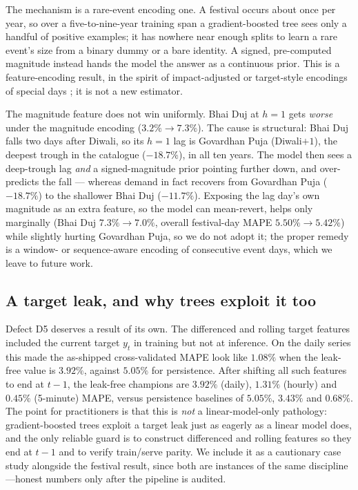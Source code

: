 \documentclass[11pt]{article}
\newcommand{\pct}{\%}
\begin{document}
The mechanism is a rare-event encoding one. A festival occurs about once per year,
so over a five-to-nine-year training span a gradient-boosted tree sees only a
handful of positive examples; it has nowhere near enough splits to learn a
rare event's size from a binary dummy or a bare identity. A signed, pre-computed
magnitude instead hands the model the answer as a continuous prior. This is a
feature-encoding result, in the spirit of impact-adjusted or target-style
encodings of special days \citep{ziel2018,arora2018}; it is not a new estimator.

The magnitude feature does not win uniformly. Bhai Duj at $h=1$ gets
\emph{worse} under the magnitude encoding ($3.2\pct \to 7.3\pct$). The cause is
structural: Bhai Duj falls two days after Diwali, so its $h=1$ lag is Govardhan
Puja (Diwali$+1$), the deepest trough in the catalogue ($-18.7\pct$), in all ten
years. The model then sees a deep-trough lag \emph{and} a signed-magnitude prior
pointing further down, and over-predicts the fall --- whereas demand in fact
recovers from Govardhan Puja ($-18.7\pct$) to the shallower Bhai Duj
($-11.7\pct$). Exposing the lag day's own magnitude as an extra feature, so the
model can mean-revert, helps only marginally (Bhai Duj $7.3\pct \to 7.0\pct$,
overall festival-day MAPE $5.50\pct \to 5.42\pct$) while slightly hurting
Govardhan Puja, so we do not adopt it; the proper remedy is a window- or
sequence-aware encoding of consecutive event days, which we leave to future work.

\subsection{A target leak, and why trees exploit it too}
\label{sec:leak}

Defect D5 deserves a result of its own. The differenced and rolling target
features included the current target $y_t$ in training but not at inference. On
the daily series this made the as-shipped cross-validated MAPE look like
$1.08\pct$ when the leak-free value is $3.92\pct$, against $5.05\pct$ for
persistence. After shifting all such features to end at $t{-}1$, the leak-free
champions are $3.92\pct$ (daily), $1.31\pct$ (hourly) and $0.45\pct$ (5-minute)
MAPE, versus persistence baselines of $5.05\pct$, $3.43\pct$ and $0.68\pct$. The
point for practitioners is that this is \emph{not} a linear-model-only
pathology: gradient-boosted trees exploit a target leak just as eagerly as a
linear model does, and the only reliable guard is to construct differenced and
rolling features so they end at $t{-}1$ and to verify train/serve parity. We
include it as a cautionary case study alongside the festival result, since both
are instances of the same discipline---honest numbers only after the pipeline is
audited.
\end{document}
